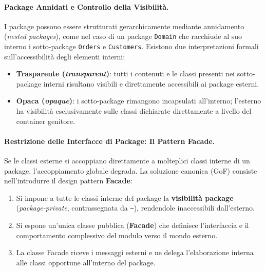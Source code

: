\documentclass[12pt]{extarticle}
\begin{document}
\paragraph{Package Annidati e Controllo della Visibilità.}
I package possono essere strutturati gerarchicamente mediante annidamento (\textit{nested packages}), come nel caso di un package \texttt{Domain} che racchiude al suo interno i sotto-package \texttt{Orders} e \texttt{Customers}. 
Esistono due interpretazioni formali sull'accessibilità degli elementi interni:
\begin{itemize}
    \item \textbf{Trasparente (\textit{transparent})}: tutti i contenuti e le classi presenti nei sotto-package interni risultano visibili e direttamente accessibili ai package esterni.
    \item \textbf{Opaca (\textit{opaque})}: i sotto-package rimangono incapsulati all'interno; l'esterno ha visibilità esclusivamente sulle classi dichiarate direttamente a livello del container genitore.
\end{itemize}

\paragraph{Restrizione delle Interfacce di Package: Il Pattern Facade.}
Se le classi esterne si accoppiano direttamente a molteplici classi interne di un package, l'accoppiamento globale degrada. La soluzione canonica (GoF) consiste nell'introdurre il design pattern \textbf{Facade}:
\begin{enumerate}
    \item Si impone a tutte le classi interne del package la \textbf{visibilità package} (\textit{package-private}, contrassegnata da \texttt{\textasciitilde}), rendendole inaccessibili dall'esterno.
    \item Si espone un'unica classe pubblica (\textbf{Facade}) che definisce l'interfaccia e il comportamento complessivo del modulo verso il mondo esterno.
    \item La classe Facade riceve i messaggi esterni e ne delega l'elaborazione interna alle classi opportune all'interno del package.
\end{enumerate}
\end{document}
